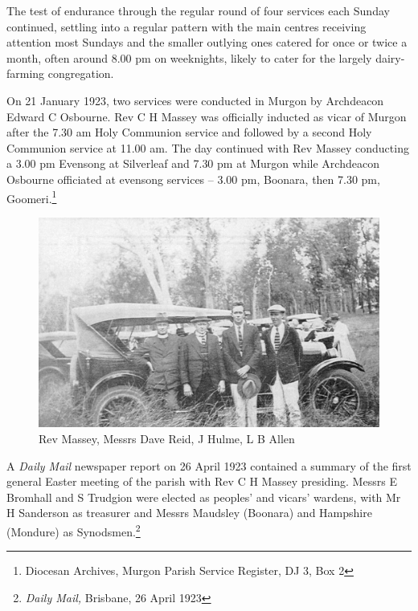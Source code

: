 The test of endurance through the regular round of four services each Sunday continued, settling into a regular pattern with the main centres receiving attention most Sundays and the smaller outlying ones catered for once or twice a month, often around 8.00 pm on weeknights, likely to cater for the largely dairy-farming congregation.



On 21 January 1923, two services were conducted in Murgon by Archdeacon Edward C Osbourne. Rev C H Massey was officially inducted as vicar of Murgon after the 7.30 am Holy Communion service and followed by a second Holy Communion service at 11.00 am. The day continued with Rev Massey conducting a 3.00 pm Evensong at Silverleaf and 7.30 pm at Murgon while Archdeacon Osbourne officiated at evensong services -- 3.00 pm, Boonara, then 7.30 pm, Goomeri.\footnote{Diocesan Archives, Murgon Parish Service Register, DJ 3, Box 2}








\begin{figure}
\begin{center}
\includegraphics[width=1.\linewidth,center]{../images/masseyRACQ.jpg}
\caption{Rev Massey, Messrs Dave Reid, J Hulme, L B Allen}
\end{center}
\end{figure}




A \emph{Daily Mail} newspaper report on 26 April 1923 contained a summary of the first general Easter meeting of the parish with Rev C H Massey presiding. Messrs E Bromhall and S Trudgion were elected as peoples' and vicars' wardens, with Mr H Sanderson as treasurer and Messrs Maudsley (Boonara) and Hampshire (Mondure) as Synodsmen.\footnote{\emph{Daily Mail,} Brisbane, 26 April 1923}


